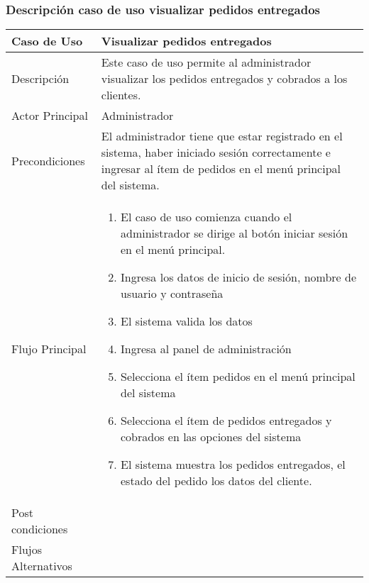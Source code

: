 \documentclass[12pt,a4paper]{article}
\begin{document}
    \newpage
\subsubsection*{Descripción caso de uso visualizar pedidos entregados}
\begin{table}[h]
        \centering
        \begin{tabular}{| p{3cm}| p{11cm} |} 
        \hline  
        Caso de Uso         &    \textbf{Visualizar pedidos entregados }   \\ 
        \hline
        Descripción         &  Este caso de uso permite al administrador visualizar los pedidos entregados y cobrados a los clientes.     \\ 
        \hline
        Actor Principal     &    Administrador  \\ 
        \hline
        Precondiciones      &   El administrador tiene que estar registrado en el sistema, haber iniciado sesión correctamente e ingresar al ítem de pedidos en el menú principal del sistema.  	\\
        \hline
        Flujo Principal     &    

            \begin{enumerate}
                \item El caso de uso comienza cuando el administrador se dirige al botón iniciar sesión en el menú principal.
                \item Ingresa los datos de inicio de sesión, nombre de usuario y contraseña
                \item El sistema valida los datos
                \item Ingresa al panel de administración
                \item Selecciona el ítem pedidos en el menú principal del sistema
                \item Selecciona el ítem de pedidos entregados y cobrados en las opciones del sistema
                \item El sistema muestra los pedidos entregados, el estado del pedido los datos del cliente.
            \end{enumerate}
        \\  
        \hline
        Post condiciones    &       \\  
        \hline
        Flujos Alternativos &       \\  
        \hline
        \end{tabular}
    \end{table}
\end{document}
